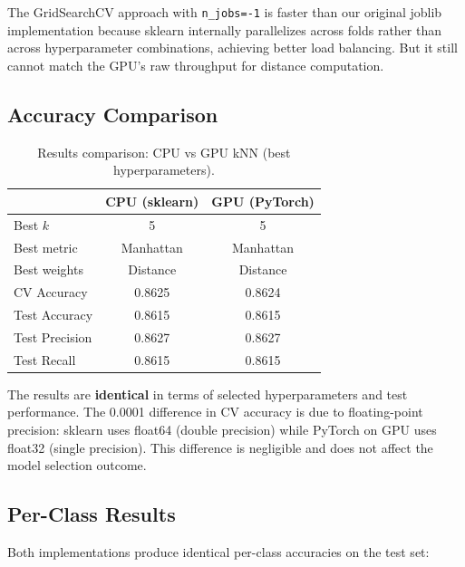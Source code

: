 \documentclass[11pt]{article}
\begin{document}
The GridSearchCV approach with \texttt{n\_jobs=-1} is faster than our original joblib implementation because sklearn internally parallelizes across folds rather than across hyperparameter combinations, achieving better load balancing. But it still cannot match the GPU's raw throughput for distance computation.

\subsection{Accuracy Comparison}

\begin{table}[H]
	\centering
	\caption{Results comparison: CPU vs GPU kNN (best hyperparameters).}
	\begin{tabular}{lcc}
		\toprule
		               & CPU (sklearn) & GPU (PyTorch) \\
		\midrule
		Best $k$       & 5             & 5             \\
		Best metric    & Manhattan     & Manhattan     \\
		Best weights   & Distance      & Distance      \\
		\midrule
		CV Accuracy    & 0.8625        & 0.8624        \\
		Test Accuracy  & 0.8615        & 0.8615        \\
		Test Precision & 0.8627        & 0.8627        \\
		Test Recall    & 0.8615        & 0.8615        \\
		\bottomrule
	\end{tabular}
	\label{tab:accuracy}
\end{table}

The results are \textbf{identical} in terms of selected hyperparameters and test performance. The 0.0001 difference in CV accuracy is due to floating-point precision: sklearn uses float64 (double precision) while PyTorch on GPU uses float32 (single precision). This difference is negligible and does not affect the model selection outcome.

\subsection{Per-Class Results}

Both implementations produce identical per-class accuracies on the test set:
\end{document}
